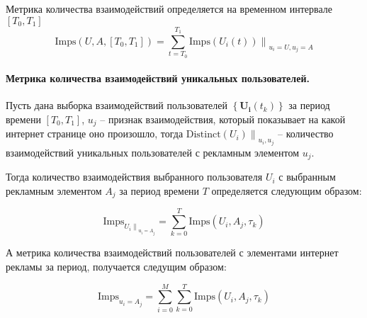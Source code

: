 \documentclass[a4paper, 14pt]{extreport}
\begin{document}
    Метрика количества взаимодействий определяется на временном интервале $\left[T_0, T_1\right]$
    \begin{equation}
        \text{Imps} \left( U, A, \left[ T_0, T_1 \right] \right) =
        \sum \limits_{t=T_0}^{T_1} \left. \text{Imps} \left( U_i (t) \right) \right\|_{u_i = U, u_j = A}
    \end{equation}


    \paragraph{Метрика количества взаимодействий уникальных пользователей.} Пусть дана выборка взаимодействий
    пользователей $\left\{\mathbf{U_i}\left(t_k\right)\right\}$ за период времени $[T_0, T_1]$,  $u_j$ -- признак
    взаимодействия, который показывает на какой интернет странице оно произошло, тогда
    $\left.\text{Distinct}\left( U_i \right)\right\|_{u_i, u_j}$ -- количество взаимодействий уникальных пользователей
    с рекламным элементом $u_j$.

    Тогда количество взаимодействия выбранного пользователя $U_i$ с выбранным рекламным элементом $A_j$ за период
    времени $T$ определяется следующим образом:

    \begin{equation}
        \text{Imps}_{\left.U_i\right\|_{u_i = A_j}} = \sum_{k = 0}^T \text{Imps}\left( U_i, A_j, \tau_k \right)
    \end{equation}

    А метрика количества взаимодействий пользователей с элементами интернет рекламы за период,
    получается следущим образом:

    \begin{equation}
        \text{Imps}_{u_i = A_j} = \sum_{i=0}^M \sum_{k = 0}^T \text{Imps}\left( U_i, A_j, \tau_k \right)
    \end{equation}
\end{document}
